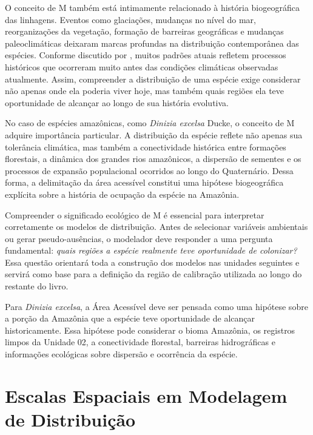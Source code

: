 O conceito de M também está intimamente relacionado à história biogeográfica das linhagens. Eventos como glaciações, mudanças no nível do mar, reorganizações da vegetação, formação de barreiras geográficas e mudanças paleoclimáticas deixaram marcas profundas na distribuição contemporânea das espécies. Conforme discutido por \textcite{Wiens2005}, muitos padrões atuais refletem processos históricos que ocorreram muito antes das condições climáticas observadas atualmente. Assim, compreender a distribuição de uma espécie exige considerar não apenas onde ela poderia viver hoje, mas também quais regiões ela teve oportunidade de alcançar ao longo de sua história evolutiva.

No caso de espécies amazônicas, como \textit{Dinizia excelsa} Ducke, o conceito de M adquire importância particular. A distribuição da espécie reflete não apenas sua tolerância climática, mas também a conectividade histórica entre formações florestais, a dinâmica dos grandes rios amazônicos, a dispersão de sementes e os processos de expansão populacional ocorridos ao longo do Quaternário. Dessa forma, a delimitação da área acessível constitui uma hipótese biogeográfica explícita sobre a história de ocupação da espécie na Amazônia.

Compreender o significado ecológico de M é essencial para interpretar corretamente os modelos de distribuição. Antes de selecionar variáveis ambientais ou gerar pseudo-ausências, o modelador deve responder a uma pergunta fundamental: \textit{quais regiões a espécie realmente teve oportunidade de colonizar?} Essa questão orientará toda a construção dos modelos nas unidades seguintes e servirá como base para a definição da região de calibração utilizada ao longo do restante do livro.

\begin{applicationbox}
	Para \textit{Dinizia excelsa}, a Área Acessível deve ser pensada como uma hipótese sobre a porção da Amazônia que a espécie teve oportunidade de alcançar historicamente. Essa hipótese pode considerar o bioma Amazônia, os registros limpos da Unidade 02, a conectividade florestal, barreiras hidrográficas e informações ecológicas sobre dispersão e ocorrência da espécie.
\end{applicationbox}


\section{Escalas Espaciais em Modelagem de Distribuição}

